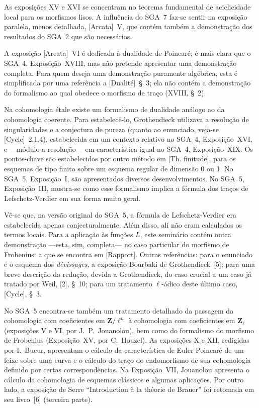 As exposições XV e XVI se concentram no teorema fundamental de aciclicidade
local para os morfismos lisos. A influência do SGA~7 faz-se sentir na
exposição paralela, menos detalhada, [Arcata]~V, que contém também a
demonstração dos resultados do SGA~2 que são necessários.

A exposição [Arcata]~VI é dedicada à dualidade de Poincaré; é mais clara que o
SGA~4, Exposição~XVIII, mas não pretende apresentar uma demonstração completa.
Para quem deseja uma demonstração puramente algébrica, esta é simplificada por
uma referência a [Dualité]~\S~3; ela não contém a demonstração do formalismo ao
qual obedece o morfismo de traço (XVIII, \S~2).

Na cohomologia étale existe um formalismo de dualidade análogo ao da
cohomologia coerente. Para estabelecê-lo, Grothendieck utilizava a resolução
de singularidades e a conjectura de pureza (quanto ao enunciado, veja-se
[Cycle]~2.1.4), estabelecida em um contexto relativo no SGA~4, Exposição~XVI,
e ---módulo a resolução--- em característica igual no SGA~4,
Exposição~XIX. Os pontos-chave são estabelecidos por outro método em
[Th. finitude], para os esquemas de tipo finito sobre um esquema regular de
dimensão 0 ou 1. No SGA~5, Exposição~I, são apresentados diversos
desenvolvimentos. No SGA~5, Exposição~III, mostra-se como esse formalismo
implica a fórmula dos traços de Lefschetz-Verdier em sua forma muito geral.

Vê-se que, na versão original do SGA~5, a fórmula de Lefschetz-Verdier era
estabelecida apenas conjecturalmente. Além disso, ali não eram calculados os
termos locais. Para a aplicação às funções $L$, este seminário contém outra
demonstração ---esta, sim, completa--- no caso particular do morfismo de
Frobenius: a que se encontra em [Rapport]. Outras referências: para o
enunciado e o esquema dos \emph{dévissages}, a exposição Bourbaki de
Grothendieck~[5]; para uma breve descrição da redução, devida a Grothendieck,
do caso crucial a um caso já tratado por Weil, [2], \S~10; para um tratamento
$\ell$-ádico deste último caso, [Cycle], \S~3.

No SGA~5 encontra-se também um tratamento detalhado da passagem da cohomologia
com coeficientes em $\mathbf{Z}/\ell^n$ à cohomologia com coeficientes em
$\mathbf{Z}_\ell$ (exposições V e VI, por J.~P.~Jouanolou), bem como do
formalismo do morfismo de Frobenius (Exposição~XV, por C.~Houzel). As
exposições X e XII, redigidas por I.~Bucur, apresentam o cálculo da
característica de Euler-Poincaré de um feixe sobre uma curva e o cálculo do
traço do endomorfismo de sua cohomologia definido por certas correspondências.
Na Exposição~VII, Jouanolou apresenta o cálculo da cohomologia de esquemas
clássicos e algumas aplicações. Por outro lado, a exposição de Serre
``Introduction à la théorie de Brauer'' foi retomada em seu livro~[6]
(terceira parte).

